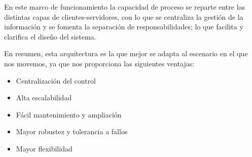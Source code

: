 En este marco de funcionamiento la capacidad de proceso se reparte entre las distintas capas de clientes-servidores, con lo que se centraliza la gestión de la información y se fomenta la separación de responsabilidades; lo que facilita y clarifica el diseño del sistema.
 
 En resumen, esta arquitectura es la que mejor se adapta al escenario en el que nos movemos, ya que nos proporciona las siguientes ventajas:
 \begin{itemize}
 	\item Centralización del control
 	\item Alta escalabilidad
 	\item Fácil mantenimiento y ampliación
 	\item Mayor robustez y tolerancia a fallos
 	\item Mayor flexibilidad
 \end{itemize}






